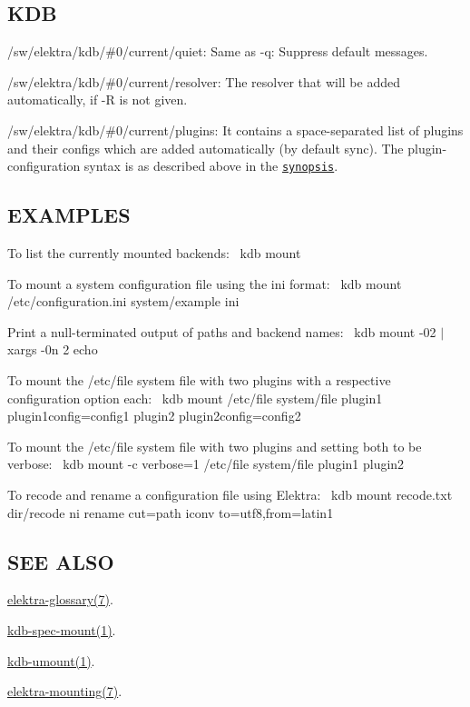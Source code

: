 \subsection*{K\+DB}


\begin{DoxyItemize}
\item {\ttfamily /sw/elektra/kdb/\#0/current/quiet}\+: Same as {\ttfamily -\/q}\+: Suppress default messages.
\item {\ttfamily /sw/elektra/kdb/\#0/current/resolver}\+: The resolver that will be added automatically, if {\ttfamily -\/R} is not given.
\item {\ttfamily /sw/elektra/kdb/\#0/current/plugins}\+: It contains a space-\/separated list of plugins and their configs which are added automatically (by default sync). The plugin-\/configuration syntax is as described above in the \href{#SYNOPSIS}{\tt synopsis}.
\end{DoxyItemize}

\subsection*{E\+X\+A\+M\+P\+L\+ES}

To list the currently mounted backends\+:~\newline
 {\ttfamily kdb mount}

To mount a system configuration file using the ini format\+:~\newline
 {\ttfamily kdb mount /etc/configuration.ini system/example ini}

Print a null-\/terminated output of paths and backend names\+:~\newline
 {\ttfamily kdb mount -\/02 $\vert$ xargs -\/0n 2 echo}

To mount the /etc/file system file with two plugins with a respective configuration option each\+:~\newline
 {\ttfamily kdb mount /etc/file system/file plugin1 plugin1config=config1 plugin2 plugin2config=config2}

To mount the /etc/file system file with two plugins and setting both to be verbose\+:~\newline
 {\ttfamily kdb mount -\/c verbose=1 /etc/file system/file plugin1 plugin2}

To recode and rename a configuration file using Elektra\+:~\newline
 {\ttfamily kdb mount recode.\+txt dir/recode ni rename cut=path iconv to=utf8,from=latin1}

\subsection*{S\+EE A\+L\+SO}


\begin{DoxyItemize}
\item \hyperlink{doc_help_elektra-glossary_md}{elektra-\/glossary(7)}.
\item \hyperlink{doc_help_kdb-spec-mount_md}{kdb-\/spec-\/mount(1)}.
\item \hyperlink{doc_help_kdb-umount_md}{kdb-\/umount(1)}.
\item \hyperlink{doc_help_elektra-mounting_md}{elektra-\/mounting(7)}. 
\end{DoxyItemize}